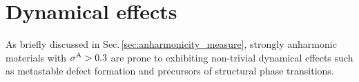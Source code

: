 


\newpage

\section{Dynamical effects}
\label{sec:dynamical_effects}
As briefly discussed in Sec.\,\ref{sec:anharmonicity_measure},
 strongly anharmonic materials with $\sigma^\mathrm{A} > 0.3$ are prone to exhibiting non-trivial dynamical effects such as metastable defect formation and precursors of structural phase transitions. 

